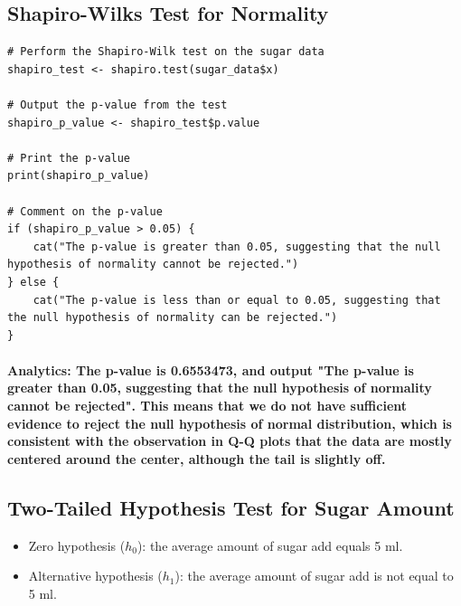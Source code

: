 \subsection{Shapiro-Wilks Test for Normality}
% 
% 
% 
% 
\begin{lstlisting}[style=rstyle]
# Perform the Shapiro-Wilk test on the sugar data
shapiro_test <- shapiro.test(sugar_data$x)

# Output the p-value from the test
shapiro_p_value <- shapiro_test$p.value

# Print the p-value
print(shapiro_p_value)

# Comment on the p-value
if (shapiro_p_value > 0.05) {
    cat("The p-value is greater than 0.05, suggesting that the null hypothesis of normality cannot be rejected.")
} else {
    cat("The p-value is less than or equal to 0.05, suggesting that the null hypothesis of normality can be rejected.")
}

\end{lstlisting}
% 
% 
% 
% 
% 
% 
% 
% 
% 
\paragraph{\textbf{Analytics:} The p-value is \textbf{0.6553473}, and output "The p-value is greater than 0.05, suggesting that the null hypothesis of normality cannot be rejected". This means that we do not have sufficient evidence to reject the null hypothesis of normal distribution, which is consistent with the observation in Q-Q plots that the data are mostly centered around the center, although the tail is slightly off.}
% 
% 
% 
% 
% 
% 
% 
% 
% 
\subsection{Two-Tailed Hypothesis Test for Sugar Amount}
% 
% 
% 
% 
% 
% 
\begin{itemize}
    \item Zero hypothesis ($h_0$): the average amount of sugar add equals 5 ml.
    \item Alternative hypothesis ($h_1$): the average amount of sugar add is not equal to 5 ml.
\end{itemize}
% 
% 
% 
% 
% 
